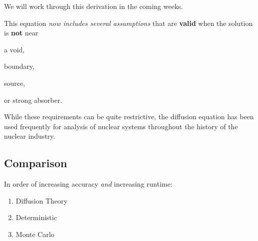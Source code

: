 \documentclass[12pt]{article}
\begin{document}
We will work through this derivation in the coming weeks.

This equation \textit{now includes several assumptions} that are \textbf{valid} when the solution is \textbf{not} near
%
\begin{compactitem}
\item a void, 
\item boundary, 
\item source, 
\item or strong absorber.
\end{compactitem} 
%
While these requirements can be quite restrictive, the diffusion equation has been used frequently for analysis of nuclear systems throughout the history of the nuclear industry.

\subsection*{Comparison}
In order of increasing accuracy\textit{ and} increasing runtime: 
\begin{enumerate}
\item Diffusion Theory
\item Deterministic
\item Monte Carlo
\end{enumerate}
\end{document}
